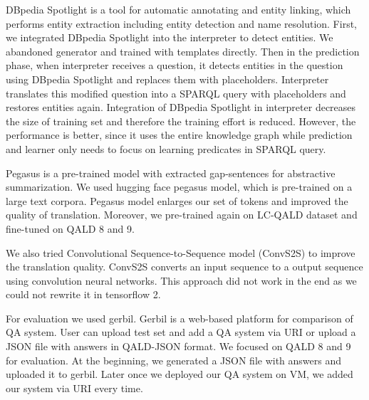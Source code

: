 DBpedia Spotlight \cite{isem2013daiber} is a tool for automatic annotating and entity linking, 
which performs entity extraction including entity detection and name resolution. 
First, we integrated DBpedia Spotlight into the interpreter to detect entities. 
We abandoned generator and trained with templates directly. 
Then in the prediction phase, 
when interpreter receives a question, 
it detects entities in the question using DBpedia Spotlight and replaces them with placeholders.
Interpreter translates this modified question into a SPARQL query with placeholders
and restores entities again. 
Integration of DBpedia Spotlight in interpreter decreases the size of training set
and therefore the training effort is reduced. 
However, the performance is better,
since it uses the entire knowledge graph while prediction
and learner only needs to focus on learning predicates in SPARQL query. 

Pegasus\cite{10.5555/3524938.3525989} is a pre-trained model with extracted gap-sentences for abstractive summarization. 
We used hugging face pegasus model, which is pre-trained on a large text corpora. 
Pegasus model enlarges our set of tokens and improved the quality of translation. 
Moreover, we pre-trained again on LC-QALD dataset and fine-tuned on QALD 8 and 9. 

We also tried Convolutional Sequence-to-Sequence model (ConvS2S) \cite{DBLP:journals/corr/GehringAGYD17} to improve the translation quality.
ConvS2S converts an input sequence to a output sequence using convolution neural networks. 
This approach did not work in the end
as we could not rewrite it in tensorflow 2. 

For evaluation we used gerbil\cite{gerbil}.
Gerbil is a web-based platform for comparison of QA system. 
User can upload test set and add a QA system via URI or upload a JSON file with answers in QALD-JSON format. 
We focused on QALD 8 and 9 for evaluation. 
At the beginning, we generated a JSON file with answers and uploaded it to gerbil. 
Later once we deployed our QA system on VM, we added our system via URI every time. 
